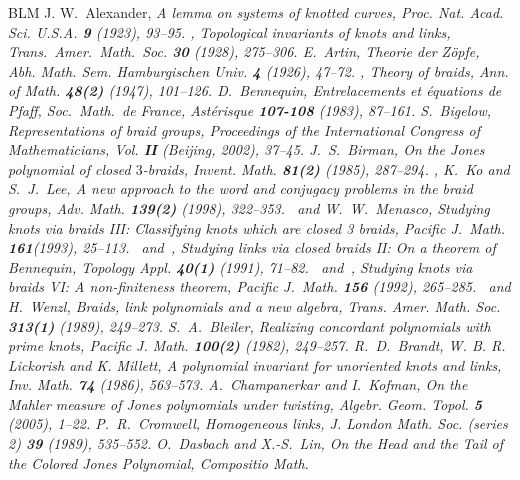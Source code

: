 {\small
\begin{thebibliography}{BLM}
 J. W.~Alexander, \em{A lemma on systems of
        knotted curves}, Proc. Nat. Acad. Sci. U.S.A.
        {\bf 9} (1923), 93--95.
 \bysame, \em{Topological invariants
        of knots and links}, Trans.\ Amer.\ Math.\ Soc. {\bf 30} (1928),
        275--306.
 E.~Artin, \em{Theorie der Z\"opfe}, 
        Abh. Math. Sem. Hamburgischen Univ. {\bf 4} (1926), 47--72.
 \bysame, \em{Theory of braids}, 
        Ann. of Math. {\bf 48(2)} (1947), 101--126.
 D.~Bennequin, \em{Entrelacements et \'equations
	de Pfaff}, Soc.\ Math.\ de France, Ast\'erisque {\bf 107-108}
	(1983), 87--161.
 S.~Bigelow, \em{Representations of braid
	groups}, Proceedings of the International Congress of
	Mathematicians, Vol. {\bf II} (Beijing, 2002),  37--45.
 J.\ S.\ Birman, \em{On the Jones polynomial of
	closed $3$-braids}, Invent. Math. {\bf 81(2)} (1985), 287--294.
 \bysame, K.\ Ko and S.\ J.\ Lee, \em{A new
	approach to the word and conjugacy problems in the braid
	groups}, Adv. Math. {\bf 139(2)} (1998), 322--353.
 \bysame\ and W.~W.~Menasco, \em{Studying knots
	via braids III: Classifying knots which are closed 3 braids},
	Pacific J.~Math. {\bf 161}(1993), 25--113.
 \bysame\ and \bysame\,, \em{Studying links
	via closed braids II: On a theorem of Bennequin},
	Topology Appl. {\bf 40(1)} (1991), 71--82.
 \bysame\, and \bysame\,, \em{Studying knots
	via braids VI: A non-finiteness theorem},
	Pacific J.~Math. {\bf 156} (1992), 265--285.
 \bysame\ and H.\ Wenzl, \em{Braids, link polynomials
	and a new algebra}, Trans. Amer. Math. Soc. {\bf 313(1)}
	(1989), 249--273.
 S.~A.~Bleiler, \em{Realizing concordant
	polynomials with prime knots}, Pacific J. Math. {\bf 100(2)}
	(1982), 249--257.
 R.~D.~Brandt, W. B. R. Lickorish and K. Millett,
	\em{A polynomial invariant for unoriented knots and links},
	Inv. Math. {\bf 74} (1986), 563--573.
 A.~Champanerkar and I.~Kofman, \em{On the Mahler
	measure of Jones polynomials under twisting},
	Algebr. Geom. Topol. {\bf 5} (2005), 1--22.
 P.~R.~Cromwell, {\em Homogeneous links},
	J. London Math. Soc. (series 2) {\bf 39} (1989), 535--552.
 O.~Dasbach and X.-S.~Lin, {\em On the Head and
	the Tail of the Colored Jones Polynomial}, Compositio Math.

\end{thebibliography}}
